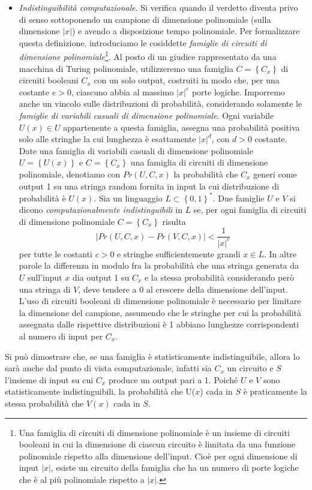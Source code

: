\documentclass{article}
\theoremstyle{definition}
\begin{document}
\begin{itemize}
    \item \emph{Indistinguibilità computazionale}. Si verifica quando il verdetto diventa privo di senso sottoponendo un campione di dimensione polinomiale (sulla dimensione $|x|$) e avendo a disposizione tempo polinomiale. Per formalizzare questa definizione, introduciamo le cosiddette \emph{famiglie di circuiti di dimensione polinomiale}\footnote{Una famiglia di circuiti di dimensione polinomiale è un insieme di circuiti booleani in cui la dimensione di ciascun circuito è limitata da una funzione polinomiale rispetto alla dimensione dell'input. Cioè per ogni dimensione di input $|x|$, esiste un circuito della famiglia che ha un numero di porte logiche che è al più polinomiale rispetto a $|x|$.}. 
    Al posto di un giudice rappresentato da una macchina di Turing polinomiale, utilizzeremo una famiglia $C = \left\{ C_x \right\}$ di circuiti booleani $C_x$ con un solo output, costruiti in modo che, per una costante $e > 0$, ciascuno abbia al massimo $|x|^e$ porte logiche.
    Imporremo anche un vincolo sulle distribuzioni di probabilità, considerando solamente le \emph{famiglie di variabili casuali di dimensione polinomiale}. Ogni variabile $U(x) \in U$ appartenente a questa famiglia, assegna una probabilità positiva solo alle stringhe la cui lunghezza è esattamente $|x|^d$, con $d > 0$ costante.
    Date una famiglia di variabili casuali di dimensione polinomiale $U = \left\{U(x)\right\}$ e $C = \left\{ C_x \right\}$ una famiglia di circuiti di dimensione polinomiale, denotiamo con $Pr(U, C, x)$ la probabilità che $C_x$ generi come output 1 su una stringa random fornita in input la cui distribuzione di probabilità è $U(x)$. Sia un linguaggio $L \subset \left\{ 0, 1 \right\}^*$. Due famiglie $U$ e $V$ si dicono \emph{computazionalmente indistinguibili} in $L$ se, per ogni famiglia di circuiti di dimensione polinomiale $C = \left\{ C_x \right\}$ risulta 
    \begin{equation*}
        \left| Pr(U, C, x) - Pr(V, C, x) \right| < \frac{1}{|x|^c}
    \end{equation*}
    per tutte le costanti $c > 0$ e stringhe sufficientemente grandi $x \in L$.
    In altre parole la differenza in modulo fra la probabilità che una stringa generata da $U$ sull'input $x$ dia output 1 su $C_x$ e la stessa probabilità considerando però una stringa di $V$, deve tendere a 0 al crescere della dimensione dell'input.
    L'uso di circuiti booleani di dimensione polinomiale è necessario per limitare la dimensione del campione, assumendo che le stringhe per cui la probabilità assegnata dalle rispettive distribuzioni è 1 abbiano lunghezze corrispondenti al numero di input per $C_x$.
\end{itemize}
Si può dimostrare che, se una famiglia è statisticamente indistinguibile, allora lo sarà anche dal punto di vista computazionale, infatti sia $C_x$ un circuito e $S$ l'insieme di input su cui $C_x$ produce un output pari a 1. Poiché $U$ e $V$ sono statisticamente indistinguibili, la probabilità che U($x$) cada in $S$ è praticamente la stessa probabilità che $V(x)$ cada in $S$.
\end{document}
